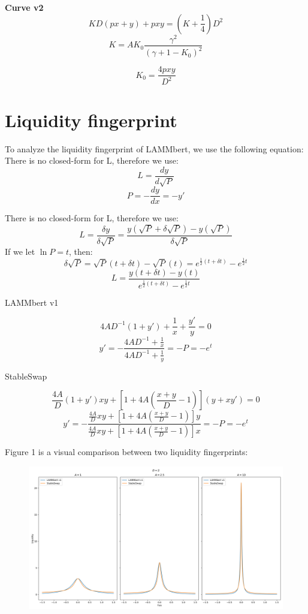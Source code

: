 \documentclass{article}
\begin{document}
\textbf{Curve v2}
$$KD(px+y)+pxy=\left(K+\frac{1}{4}\right)D^2$$
$$K=AK_{0}\frac{\gamma^2}{(\gamma+1-K_{0})^2}$$

$$K_{0}=\frac{4pxy}{D^2}$$

\section{Liquidity fingerprint}
To analyze the liquidity fingerprint of LAMMbert, we use the following equation:
There is no closed-form for L, therefore we use:
$$L=\frac{dy}{d\sqrt{P}}$$
$$P=-\frac{dy}{dx}=-y'$$

There is no closed-form for L, therefore we use:
$$L=\frac{\delta y}{\delta\sqrt{P}}=\frac{y(\sqrt{P}+\delta\sqrt{P})-y(\sqrt{P})}{\delta\sqrt{P}}$$
If we let $\ln P=t$, then:
$$\delta\sqrt{P}=\sqrt{P}(t+\delta t)-\sqrt{P}(t)=e^{\frac{1}{2}(t+\delta t)}-{e^{\frac{1}{2}t}}$$
$$L=\frac{y(t+\delta t)-y(t)}{e^{\frac{1}{2}(t+\delta t)}-{e^{\frac{1}{2}t}}}$$

LAMMbert v1

$$4AD^{-1}(1+y')+\frac{1}{x}+\frac{y'}{y}=0$$
$$y'=-\frac{4AD^{-1}+\frac{1}{x}}{4AD^{-1}+\frac{1}{y}}=-P=-e^t$$

StableSwap


$$\frac{4A}{D}(1+y')xy+\left[1+4A\left(\frac{x+y}{D}-1\right)\right](y+xy')=0$$
$$y'=-\frac{\frac{4A}{D}xy+\left[1+4A\left(\frac{x+y}{D}-1\right)\right]y}{\frac{4A}{D}xy+\left[1+4A\left(\frac{x+y}{D}-1\right)\right]x}=-P=-e^t$$

Figure 1 is a visual comparison between two liquidity fingerprints:

\begin{figure}[H]
    \centering
    \includegraphics[width=1\linewidth]{figure1.png}
    \label{1}
\end{figure}
\end{document}
